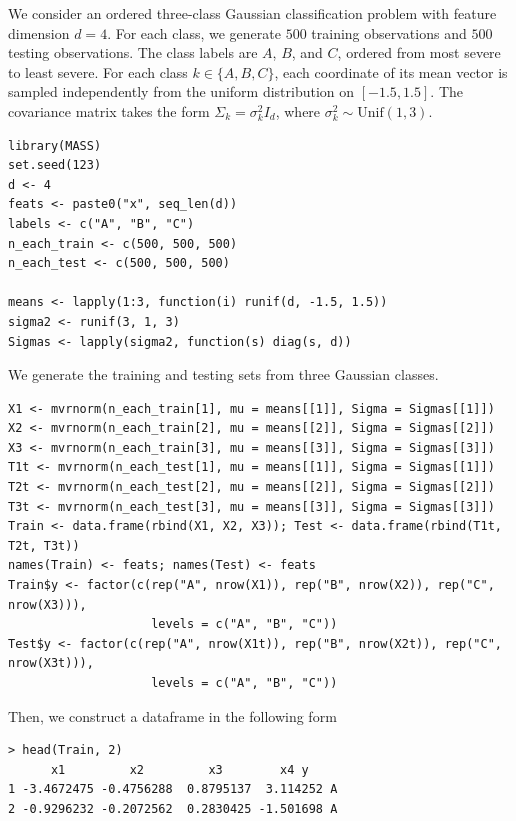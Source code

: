 We consider an ordered three-class Gaussian classification problem with feature dimension $d=4$. For each class, we generate $500$ training observations and $500$ testing observations. The class labels are $A$, $B$, and $C$, ordered from most severe to least severe. For each class $k \in \{A, B, C\}$, each coordinate of its mean vector is sampled independently from the uniform distribution on $[-1.5,1.5]$. The covariance matrix takes the form $\Sigma_k = \sigma_k^2 I_d$, where $\sigma_k^2 \sim \mathrm{Unif}(1,3)$.




\begin{verbatim}
library(MASS)
set.seed(123)
d <- 4
feats <- paste0("x", seq_len(d))
labels <- c("A", "B", "C")
n_each_train <- c(500, 500, 500)
n_each_test <- c(500, 500, 500)

means <- lapply(1:3, function(i) runif(d, -1.5, 1.5))
sigma2 <- runif(3, 1, 3)
Sigmas <- lapply(sigma2, function(s) diag(s, d))
\end{verbatim}
We generate the training and testing sets from three Gaussian classes.

\begin{verbatim}
X1 <- mvrnorm(n_each_train[1], mu = means[[1]], Sigma = Sigmas[[1]])
X2 <- mvrnorm(n_each_train[2], mu = means[[2]], Sigma = Sigmas[[2]])
X3 <- mvrnorm(n_each_train[3], mu = means[[3]], Sigma = Sigmas[[3]])
T1t <- mvrnorm(n_each_test[1], mu = means[[1]], Sigma = Sigmas[[1]])
T2t <- mvrnorm(n_each_test[2], mu = means[[2]], Sigma = Sigmas[[2]])
T3t <- mvrnorm(n_each_test[3], mu = means[[3]], Sigma = Sigmas[[3]])
Train <- data.frame(rbind(X1, X2, X3)); Test <- data.frame(rbind(T1t, T2t, T3t))
names(Train) <- feats; names(Test) <- feats
Train$y <- factor(c(rep("A", nrow(X1)), rep("B", nrow(X2)), rep("C", nrow(X3))),
                    levels = c("A", "B", "C"))
Test$y <- factor(c(rep("A", nrow(X1t)), rep("B", nrow(X2t)), rep("C", nrow(X3t))),
                    levels = c("A", "B", "C"))
\end{verbatim}
Then, we construct a dataframe in the following form
\begin{verbatim}
> head(Train, 2)
      x1         x2         x3        x4 y
1 -3.4672475 -0.4756288  0.8795137  3.114252 A
2 -0.9296232 -0.2072562  0.2830425 -1.501698 A
\end{verbatim}


